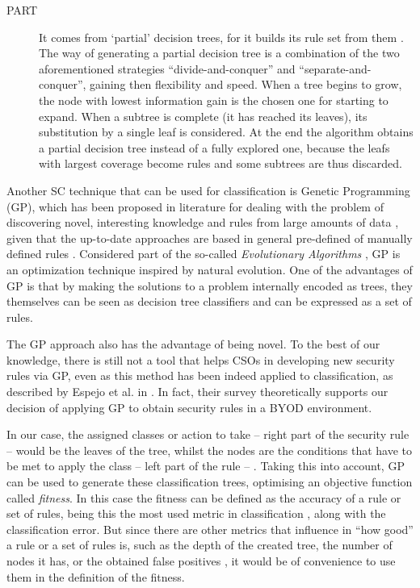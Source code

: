 \begin{description}
   \item[PART] It comes from `partial' decision trees, for it builds its rule set from them \cite{Frank1998}. The way of generating a partial decision tree is a combination of the two aforementioned strategies ``divide-and-conquer'' and ``separate-and-conquer'', gaining then flexibility and speed. When a tree begins to grow, the node with lowest information gain is the chosen one for starting to expand. When a subtree is complete (it has reached its leaves), its substitution by a single leaf is considered. At the end the algorithm obtains a partial decision tree instead of a fully explored one, because the leafs with largest coverage become rules and some subtrees are thus discarded.
 \end{description} 
 
Another SC technique that can be used for classification is Genetic Programming (GP), which has been proposed in literature for dealing with the problem of discovering novel, interesting knowledge and rules from large amounts of data \cite{freitas2002data}, given that the up-to-date approaches are based in general pre-defined of manually defined rules \cite{ali2015analysis}. Considered part of the so-called \emph{Evolutionary Algorithms} \cite{back1996evolutionary}, GP is an optimization technique inspired by natural evolution. One of the advantages of GP is that by making the solutions to a problem internally encoded as trees, they themselves can be seen as decision tree classifiers \cite{safavian1990survey} and can be expressed as a set of rules.

The GP approach also has the advantage of being novel. To the best of our knowledge, there is still not a tool that helps CSOs in
developing new security rules via GP, even as this method has been indeed applied to classification, as described by Espejo et al. in \cite{espejo2010survey}. In fact, their survey theoretically supports our decision of applying GP to obtain security rules in a BYOD environment.

In our case, the assigned classes or action to take -- right part of the security rule -- would be the leaves of the tree, whilst the nodes are the conditions that have to be met to apply the class -- left part of the rule -- . Taking this into account, GP can be used to generate these classification trees, optimising an objective function called {\em fitness}. In this case the fitness can be defined as the accuracy of a rule or set of rules, being this the most used metric in classification \cite{witten2016data}, along with the classification error. But since there are other metrics that influence in ``how good'' a rule or a set of rules is, such as the depth of the created tree, the number of nodes it has, or the obtained false positives
\cite{back1996evolutionary}, it would be of convenience to use them in the definition of the fitness.

